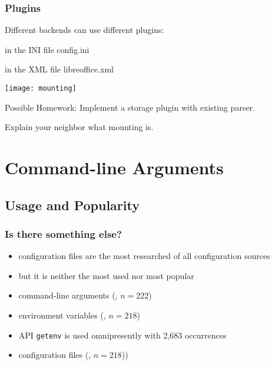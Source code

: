 \documentclass{beamer}
\begin{document}
\begin{frame}
	\frametitle{Plugins}

	Different backends can use different plugins:
	\begin{description}[labelsep=10cm,align=right]
	\item[\texttt{/sw}] in the INI file config.ini
	\item[\texttt{/sw/libreoffice}] in the XML file libreoffice.xml
	\end{description}

	\texttt{[image: mounting]}
\end{frame}

\begin{assignment}
	\begin{task}
	Possible Homework: Implement a storage plugin with existing parser.
	\end{task}

	\begin{task}
	Explain your neighbor what mounting is.
	\end{task}
\end{assignment}


\section{Command-line Arguments}

\subsection{Usage and Popularity}

\begin{frame}
	\frametitle{Is there something else?}
	\begin{itemize}
	\item configuration files are the most researched of all configuration sources~\cite{jin2014configurations}
	\item but it is neither the most used nor most popular~\cite{raab2017challenges}
	\end{itemize}
\end{frame}

\begin{frame}
	\methodQuestion{} 
	\begin{itemize}
	\item command-line arguments (, $n=222$)
	\item environment variables (, $n=218$)
	\item \methodSource{} API \texttt{getenv} is used omnipresently with 2,683 occurrences
	\item configuration files (, $n=218$))
	\end{itemize}
\end{frame}
\end{document}
